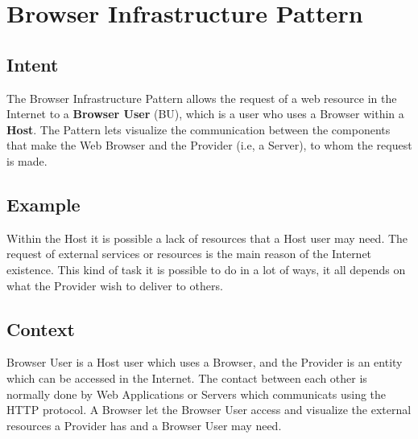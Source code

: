 \documentclass{sig-alternate-05-2015}
\begin{document}
\section*{Browser Infrastructure Pattern}

  \subsection*{Intent}
  The Browser Infrastructure Pattern allows the request of a web resource in the Internet to a \textbf{Browser User} (BU), which is a user who uses a Browser within a \textbf{Host}. The Pattern lets visualize the communication between the components that make the Web Browser and the Provider (i.e, a Server), to whom the request is made.

  \subsection*{Example}
  Within the Host it is possible a lack of resources that a Host user may need. The request of external services or resources is the main reason of the Internet existence. This kind of task it is possible to do in a lot of ways, it all depends on what the Provider wish to deliver to others.
  
  \subsection*{Context}
  Browser User is a Host user which uses a Browser, and the Provider is an entity which can be accessed in the Internet. The contact between each other is normally done by Web Applications or Servers which communicats using the HTTP protocol. A Browser let the Browser User access and visualize the external resources a Provider has and a Browser User may need.
  
\end{document}
